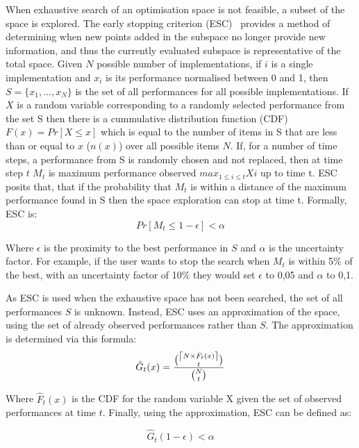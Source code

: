 When exhaustive search of an optimisation space is not feasible, a subset of the space is explored.
The early stopping criterion (ESC)~\cite{vuduc2003AutomaticPerf} provides a method of determining when new points added in the subspace no longer provide new information, and thus the currently evaluated subspace is representative of the total space.
Given $N$ possible number of implementations, if $i$ is a single implementation and $x_i$ is its performance normalised between 0 and 1, then $S=\{x_1,...,x_N\}$ is the set of all performances for all possible implementations.
If $X$ is a random variable corresponding to a randomly selected performance from the set S then there is a cummulative distribution function (CDF) $F(x) = Pr[X \le x]$ which is equal to the number of items in S that are less than or equal to $x$ ($n(x)$) over all possible items $N$.
If, for a number of time steps, a performance from S is randomly chosen and not replaced, then at time step $t$ $M_t$ is maximum performance observed $max_{1\le i \le t} Xi$ up to time t.
ESC posits that, that if the probability that $M_t$ is within a distance of the maximum performance found in S then the space exploration can stop at time t.
Formally, ESC is:
\begin{equation}
Pr[M_t \le 1 - \epsilon ] < \alpha
\end{equation}

Where $\epsilon$ is the proximity to the best performance in $S$ and $\alpha$ is the uncertainty factor.
For example, if the user wants to stop the search when $M_t$ is within 5\% of the best, with an uncertainty factor of 10\% they would set $\epsilon$ to 0,05 and $\alpha$ to 0,1.

As ESC is used when the exhaustive space has not been searched, the set of all performances $S$ is unknown.
Instead, ESC uses an approximation of the space, using the set of already observed performances rather than $S$.
The approximation is determined via this formula:
\begin{equation}
\hat{G}_t(x) = \frac{ \binom{\ceil*{N \times \hat{F}_t(x)}}{t}}{\binom{N}{t}}
\end{equation}

Where $\hat{F}_t(x)$ is the CDF for the random variable X given the set of observed performances at time $t$.
Finally, using the approximation, ESC can be defined as:

\begin{equation}
\hat{G}_t(1-\epsilon) < \alpha
\end{equation}

